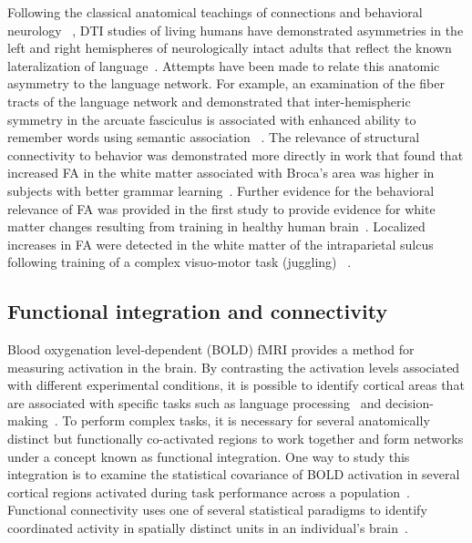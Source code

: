 Following the classical anatomical teachings of connections and behavioral neurology ~\cite{Geschwind1965b,Geschwind1970}, DTI studies of living humans have demonstrated asymmetries in the left and right hemispheres of neurologically intact adults that reflect the known lateralization of language~\cite{Catani2008,Glasser2008}. Attempts have been made to relate this anatomic asymmetry to the language network. For example, an examination of the fiber tracts of the language network and demonstrated that inter-hemispheric symmetry in the arcuate fasciculus is associated with enhanced ability to remember words using semantic association ~\cite{Catani2007}. The relevance of structural connectivity to behavior was demonstrated more directly in work that found that increased FA in the white matter associated with Broca's area was higher in subjects with better grammar learning~\cite{Floel2009}. Further evidence for the behavioral relevance of FA was provided in the first study to provide evidence for white matter changes resulting from training in healthy human brain~\cite{Scholz2009}. Localized increases in FA were detected in the white matter of the intraparietal sulcus following training of a complex visuo-motor task (juggling) ~\cite{Scholz2009}. 

\subsection{Functional integration and connectivity}
Blood oxygenation level-dependent (BOLD) fMRI provides a method for measuring activation in the brain. By contrasting the activation levels associated with different experimental conditions, it is possible to identify cortical areas that are associated with specific tasks such as language processing~\cite{Frost1999,Bookheimer2002} and decision-making~\cite{Sanfey2003,McCabe2001}. To perform complex tasks, it is necessary for several anatomically distinct but functionally co-activated regions to work together and form networks under a concept known as functional integration. One way to study this integration is to examine the statistical covariance of BOLD activation in several cortical regions activated during task performance across a population~\cite{Horwitz1990,McIntosh1994}. Functional connectivity uses one of several statistical paradigms to identify coordinated activity in spatially distinct units in an individual's brain~\cite{Rykhlevskaia2008}. 

